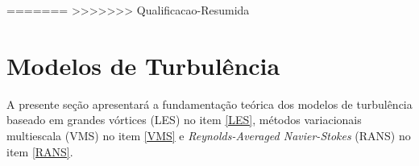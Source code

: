 \documentclass[_ArquivoPrincipal.tex]{subfiles}
\begin{document}
=======
>>>>>>> Qualificacao-Resumida
\section{Modelos de Turbulência} \label{MdT}

A presente seção apresentará a fundamentação teórica dos modelos de turbulência baseado em grandes vórtices (LES) no item \ref{LES}, métodos variacionais multiescala (VMS) no item \ref{VMS} e \textit{Reynolds-Averaged Navier-Stokes} (RANS) no item \ref{RANS}.





\end{document}
